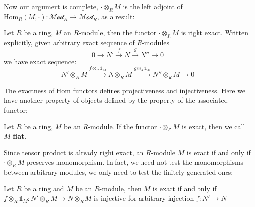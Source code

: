 \documentclass{note-eng}
\begin{document}
Now our argument is complete, $\cdot \otimes_R M$ is the left adjoint of $\mathrm{Hom}_{R}(M, \cdot): \mathscr{Mod}_R \rightarrow \mathscr{Mod}_R$, as a result:

\begin{corollary}
     Let $R$ be a ring, $M$ an $R$-module, then the functor $\cdot \otimes_R M$ is right exact. Written explicitly, given arbitrary exact sequence of $R$-modules
    $$0 \rightarrow N' \xrightarrow{f} N \xrightarrow{g} N'' \rightarrow 0$$
    we have exact sequence:
    $$N' \otimes_R M \xrightarrow{f \otimes_R \mathds{1}_M} N \otimes_R M \xrightarrow{g \otimes_R \mathds{1}_M} N'' \otimes_R M \rightarrow 0$$
\end{corollary}

\iffalse
If the context is clear, we shall use $x \otimes y$ instead of $x \otimes_R y$ to denote $T_{M, N}(x, y)$. However, both notations are actually ambiguous, as the value of $x \otimes y$ depends on the modules $M, N$:

\begin{example}
    Let $M = \mathbb{Z}, N = \mathbb{Z}, N' = \mathbb{Z} / 2$, then $2 \otimes_\mathbb{Z} 1 \ne 0$ in $M \otimes_\mathbb{Z} N$, but $2 \otimes_\mathbb{Z} 1 = 2 (1 \otimes_\mathbb{Z} 1) = 1 \otimes_\mathbb{Z} 0 = 0$ in $M \otimes_\mathbb{Z} N'$.
\end{example}
\fi

The exactness of $\mathrm{Hom}$ functors defines projectiveness and injectiveness. Here we have another property of objects defined by the property of the associated functor:

\begin{definition}[Flat]
    Let $R$ be a ring, $M$ be an $R$-module. If the functor $\cdot \otimes_R M$ is exact, then we call $M$ \textbf{flat}.
\end{definition}

Since tensor product is already right exact, an $R$-module $M$ is exact if and only if $\cdot \otimes_R M$ preserves monomorphism. In fact, we need not test the monomorphisms between arbitrary modules, we only need to test the finitely generated ones:

\begin{proposition}
    Let $R$ be a ring and $M$ be an $R$-module, then $M$ is exact if and only if $f \otimes_R \mathds{1}_M: N' \otimes_R M \rightarrow N \otimes_R M$ is injective for arbitrary injection $f: N' \rightarrow N$
\end{proposition}
\end{document}
